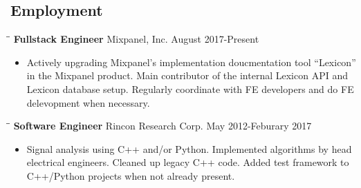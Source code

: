 \documentclass{res}
\begin{document}
 
\thispagestyle{empty} %
\address{ksiondag846@gmail.com\\
(520) 329-5081\\
\url{https://github.com/ksiondag}}


\begin{resume}
   
\section{Employment} 
\vspace{0.1in} 
  \begin{tabbing}
    \hspace{2.3in}\= \hspace{2.6in}\= \kill %
    {\bf Fullstack Engineer} \>Mixpanel, Inc.     \>August 2017-Present
  \end{tabbing}\vspace{-5pt}      %
    \begin{itemize} %
      \item[] Actively upgrading Mixpanel's implementation doucmentation tool ``Lexicon'' in the Mixpanel
      product. Main contributor of the internal Lexicon API and Lexicon database setup. Regularly
      coordinate with FE developers and do FE delevopment when necessary.
    \end{itemize}

  \vspace{-20pt}\begin{tabbing}
    \hspace{2.3in}\= \hspace{2.6in}\= \kill %
    {\bf Software Engineer} \>Rincon Research Corp. \> May 2012-Feburary 2017
  \end{tabbing}\vspace{-5pt}
    \begin{itemize} %
      \item[] Signal analysis using C++ and/or Python. Implemented algorithms by head electrical engineers.
      Cleaned up legacy C++ code. Added test framework to C++/Python projects when not already present.
    \end{itemize}


\end{resume}
\end{document}
